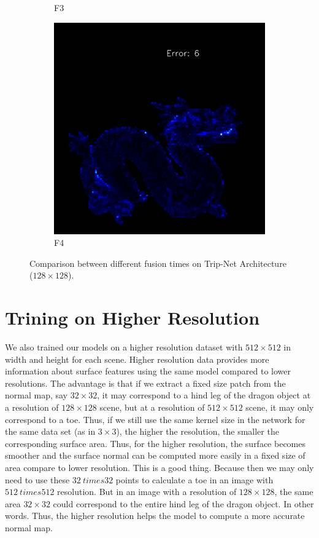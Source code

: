 \begin{figure}
\begin{subfigure}[b]{0.18\linewidth}
		\caption{F3}
	\end{subfigure}
	\begin{subfigure}[b]{0.18\linewidth}
		\includegraphics[width=\linewidth]{./Figures/gcnn_synthetic/fancy_eval_7_error_f4.png}
		\caption{F4}
	\end{subfigure}
	
	\decoRule
	\caption{Comparison between different fusion times on Trip-Net Architecture ($ 128\times128 $). }
	\label{fig:tripnet-fusion-eval}
\end{figure}




\section{Trining on Higher Resolution}
We also trained our models on a higher resolution dataset with $ 512 \times 512 $ in width and height for each scene. Higher resolution data provides more information about surface features using the same model compared to lower resolutions. The advantage is that if we extract a fixed size patch from the normal map, say $32\times32$, it may correspond to a hind leg of the dragon object at a resolution of $128 \times 128$ scene, but at a resolution of $512\times 512$ scene, it may only correspond to a toe. Thus, if we still use the same kernel size in the network for the same data set (as in $ 3\times 3 $), the higher the resolution, the smaller the corresponding surface area. 
Thus, for the higher resolution, the surface becomes smoother and the surface normal can be computed more easily in a fixed size of area compare to lower resolution. This is a good thing. Because then we may only need to use these $ 32\ times 32 $ points to calculate a toe in an image with $ 512\ times512 $ resolution. But in an image with a resolution of $ 128\times128 $, the same area $ 32\times32 $ could correspond to the entire hind leg of the dragon object. In other words. Thus, the higher resolution helps the model to compute a more accurate normal map. 



